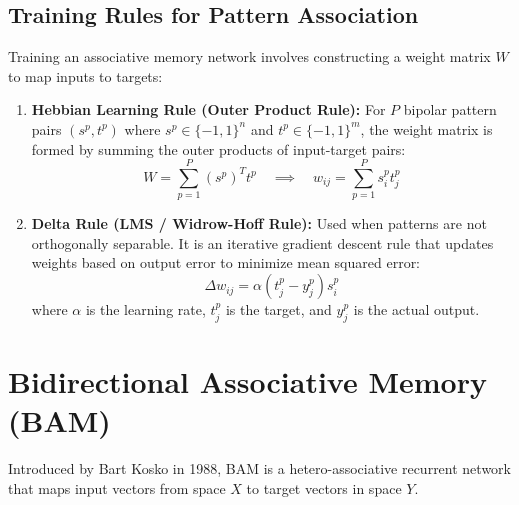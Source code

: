 \documentclass[12pt,a4paper]{article}
\begin{document}
\subsection{Training Rules for Pattern Association}
Training an associative memory network involves constructing a weight matrix $W$ to map inputs to targets:
\begin{enumerate}[leftmargin=*, itemsep=3.5pt]
  \item \textbf{Hebbian Learning Rule (Outer Product Rule):}
    For $P$ bipolar pattern pairs $(s^p, t^p)$ where $s^p \in \{-1, 1\}^n$ and $t^p \in \{-1, 1\}^m$, the weight matrix is formed by summing the outer products of input-target pairs:
    \begin{equation}
      W = \sum_{p=1}^P (s^p)^T t^p \quad \implies \quad w_{ij} = \sum_{p=1}^P s_i^p t_j^p
    \end{equation}
  \item \textbf{Delta Rule (LMS / Widrow-Hoff Rule):}
    Used when patterns are not orthogonally separable. It is an iterative gradient descent rule that updates weights based on output error to minimize mean squared error:
    \begin{equation}
      \Delta w_{ij} = \alpha (t_j^p - y_j^p) s_i^p
    \end{equation}
    where $\alpha$ is the learning rate, $t_j^p$ is the target, and $y_j^p$ is the actual output.
\end{enumerate}

\section{Bidirectional Associative Memory (BAM)}

Introduced by Bart Kosko in 1988, BAM is a hetero-associative recurrent network that maps input vectors from space $X$ to target vectors in space $Y$.
\end{document}
